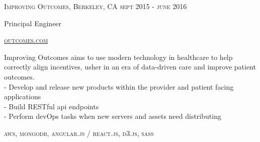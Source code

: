 {
  \textsc{\small{Improving Outcomes, Berkeley, CA
    \hfill
      {\raggedleft
        sept 2015 - june 2016
      } \\
    }
  }
  {\raggedright\large {
      Principal Engineer
  }}

  \textsc{\small\href{http://www.outcomes.com}{outcomes.com}}

  \normalsize{\raggedright
    Improving Outcomes aims to use modern technology in healthcare to help correctly align incentives, usher in an era of data-driven care and improve patient outcomes. \\
    - Develop and release new products within the provider and patient facing applications \\
    - Build RESTful api endpoints \\
    - Perform devOps tasks when new servers and assets need distributing
  }

  \textsc{\small{\color{highlight}
    aws,
    mongodb,
    angular.js / react.js,
    d3.js,
    sass
  }}
}
